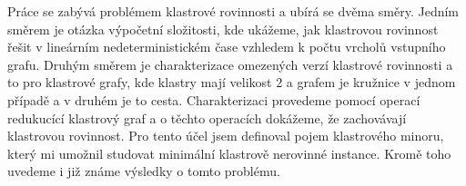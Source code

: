 \documentclass[12pt,a4report]{report}
\begin{document}
\author{Filip Šedivý}

Práce se zabývá problémem klastrové rovinnosti a ubírá se dvěma směry. Jedním směrem je otázka výpočetní složitosti, kde ukážeme, jak klastrovou rovinnost řešit v lineárním nedeterministickém čase vzhledem k počtu vrcholů vstupního grafu. Druhým směrem je charakterizace omezených verzí klastrové rovinnosti a to pro klastrové grafy, kde klastry mají velikost 2 a grafem je kružnice v jednom případě a v druhém je to cesta. Charakterizaci provedeme pomocí operací redukucící klastrový graf a o těchto operacích dokážeme, že zachovávají klastrovou rovinnost. Pro tento účel jsem definoval pojem klastrového minoru, který mi umožnil studovat minimální klastrově nerovinné instance. Kromě toho uvedeme i již známe výsledky o tomto problému.
\end{document}
